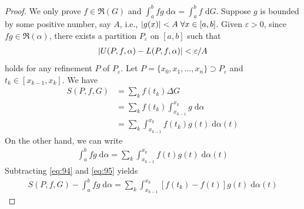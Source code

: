 \documentclass[thmcnt=section, 12pt]{my-elegantbook}
\begin{document}
\begin{proof}
    We only prove $f \in \mathfrak{R}(G)$ and $\int_{a}^{b} f g \; \mathrm{d}\alpha = \int_{a}^{b} f \; \mathrm{d}G$. Suppose $g$ is bounded by some positive number, say $A$, i.e., $\left\lvert g(x) \right\rvert < A \; \forall x \in [a, b]$. Given $\varepsilon > 0$, since $f g \in \mathfrak{R}(\alpha)$, there exists a partition $P_\varepsilon$ on $[a, b]$ such that 
    \begin{align}
        \left\lvert U(P,f,\alpha) - L(P,f,\alpha) \right\rvert < \varepsilon / A
        \label{eq:96}
    \end{align}
    holds for any refinement $P$ of $P_\varepsilon$. Let $P = \{x_0, x_1, \ldots, x_n\} \supset P_\varepsilon$ and $t_k \in [x_{k-1}, x_k]$. We have
    \begin{align}
        S(P,f, G) 
        &= \sum_k f(t_k) \Delta G \nonumber \\
        &= \sum_k f(t_k) \int_{x_{k-1}}^{x_k} g \; \mathrm{d}\alpha \nonumber \\ 
        &= \sum_k \int_{x_{k-1}}^{x_k} f(t_k) g(t) \; \mathrm{d}\alpha(t)
        \label{eq:94}
    \end{align}
    On the other hand, we can write
    \begin{align}
        \int_{a}^{b} f g  \; \mathrm{d}\alpha
        = \sum_k \int_{x_{k-1}}^{x_k} f(t) g(t) \; \mathrm{d}\alpha(t)
        \label{eq:95}
    \end{align}
    Subtracting \eqref{eq:94} and \eqref{eq:95} yields
    \begin{align*}
        S(P,f, G) - \int_{a}^{b} f g  \; \mathrm{d}\alpha
        = \sum_k \int_{x_{k-1}}^{x_k} [f(t_k) - f(t)] g(t) \; \mathrm{d}\alpha(t)
    \end{align*}
    

\end{proof}
\end{document}
